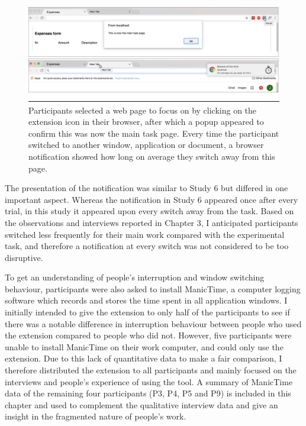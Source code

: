 \begin{figure}
\centering
\centerline{\includegraphics[scale=0.17]{images/ch56/ch56-7_taskinterface.pdf}}
\caption[Study 7 browser extension]{Participants selected a web page to focus on by clicking on the extension icon in their browser, after which a popup appeared to confirm this was now the main task page. Every time the participant switched to another window, application or document, a browser notification showed how long on average they switch away from this page.}
\label{fig:ch56-7_taskinterface}
\end{figure}

The presentation of the notification was similar to Study 6 but differed in one important aspect. Whereas the notification in Study 6 appeared once after every trial, in this study it appeared upon every switch away from the task. Based on the observations and interviews reported in Chapter 3, I anticipated participants switched less frequently for their main work compared with the experimental task, and therefore a notification at every switch was not considered to be too disruptive.

To get an understanding of people’s interruption and window switching behaviour, participants were also asked to install ManicTime, a computer logging software which records and stores the time spent in all application windows. I initially intended to give the extension to only half of the participants to see if there was a notable difference in interruption behaviour between people who used the extension compared to people who did not. However, five participants were unable to install ManicTime on their work computer, and could only use the extension. Due to this lack of quantitative data to make a fair comparison, I therefore distributed the extension to all participants and mainly focused on the interviews and people’s experience of using the tool. A summary of ManicTime data of the remaining four participants (P3, P4, P5 and P9) is included in this chapter and used to complement the qualitative interview data and give an insight in the fragmented nature of people’s work.

